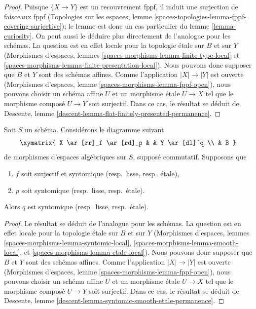 \begin{proof}
Puisque $\{X \to Y\}$ est un recouvrement fppf, il induit une surjection de
faisceaux fppf (Topologies sur les espaces, lemme
\ref{spaces-topologies-lemma-fppf-covering-surjective}); le
lemme est donc un cas particulier du lemme \ref{lemma-curiosity}.
On peut aussi le déduire plus directement de
l'analogue pour les schémas. La question est en effet locale pour la topologie \'etale
sur $B$ et sur $Y$ (Morphismes d'espaces, lemmes
\ref{spaces-morphisms-lemma-finite-type-local} et
\ref{spaces-morphisms-lemma-finite-presentation-local}).
Nous pouvons donc supposer que $B$ et $Y$ sont des
schémas affines. Comme l'application $|X| \to |Y|$ est ouverte
(Morphismes d'espaces, lemme \ref{spaces-morphisms-lemma-fppf-open}),
nous pouvons choisir un
schéma affine $U$ et un morphisme \'etale $U \to X$ tel que le
morphisme composé $U \to Y$ soit surjectif. Dans ce cas, le résultat
se déduit de Descente, lemme
\ref{descent-lemma-flat-finitely-presented-permanence}.
\end{proof}

\begin{lemma}
\label{lemma-syntomic-smooth-etale-permanence}
Soit $S$ un schéma. Considérons le diagramme suivant
$$
\xymatrix{
X \ar[rr]_f \ar[rd]_p & &
Y \ar[dl]^q \\
& B
}
$$
de morphismes d'espaces algébriques sur $S$, supposé commutatif.
Supposons que
\begin{enumerate}
\item $f$ soit surjectif et syntomique (resp.\ lisse, resp.\ \'etale),
\item $p$ soit syntomique (resp.\ lisse, resp.\ \'etale).
\end{enumerate}
Alors $q$ est syntomique (resp.\ lisse, resp.\ \'etale).
\end{lemma}

\begin{proof}
Le résultat se déduit de l'analogue pour les schémas.
La question est en effet locale pour la topologie \'etale sur $B$ et sur $Y$
(Morphismes d'espaces, lemmes
\ref{spaces-morphisms-lemma-syntomic-local},
\ref{spaces-morphisms-lemma-smooth-local}, et
\ref{spaces-morphisms-lemma-etale-local}).
Nous pouvons donc supposer que $B$ et $Y$ sont des
schémas affines. Comme l'application $|X| \to |Y|$ est ouverte
(Morphismes d'espaces, lemme \ref{spaces-morphisms-lemma-fppf-open}),
nous pouvons choisir un
schéma affine $U$ et un morphisme \'etale $U \to X$ tel que le
morphisme composé $U \to Y$ soit surjectif. Dans ce cas, le résultat
se déduit de Descente, lemme
\ref{descent-lemma-syntomic-smooth-etale-permanence}.
\end{proof}

